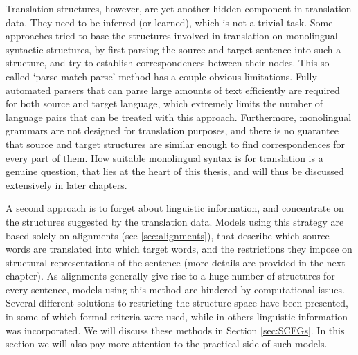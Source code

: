 %
%
%
%
%
%
%

Translation structures, however, are yet another hidden component in translation data. They need to be inferred (or learned), which is not a trivial task. Some approaches tried to base the structures involved in translation on monolingual syntactic structures, by first parsing the source and target sentence into such a structure, and try to establish correspondences between their nodes. This so called `parse-match-parse' method has a couple obvious limitations. Fully automated parsers that can parse large amounts of text efficiently are required for both source and target language, which extremely limits the number of language pairs that can be treated with this approach. Furthermore, monolingual grammars are not designed for translation purposes, and there is no guarantee that source and target structures are similar enough to find correspondences for every part of them. How suitable monolingual syntax is for translation is a genuine question, that lies at the heart of this thesis, and will thus be discussed extensively in later chapters.

A second approach is to forget about linguistic information, and concentrate on the structures suggested by the translation data. Models using this strategy are based solely on alignments (see \ref{sec:alignments}), that describe which source words are translated into which target words, and the restrictions they impose on structural representations of the sentence (more details are provided in the next chapter). As alignments generally give rise to a huge number of structures for every sentence, models using this method are hindered by computational issues. Several different solutions to restricting the structure space have been presented, in some of which formal criteria were used, while in others linguistic information was incorporated. We will discuss these methods in Section \ref{sec:SCFGs}. In this section we will also pay more attention to the practical side of such models.

